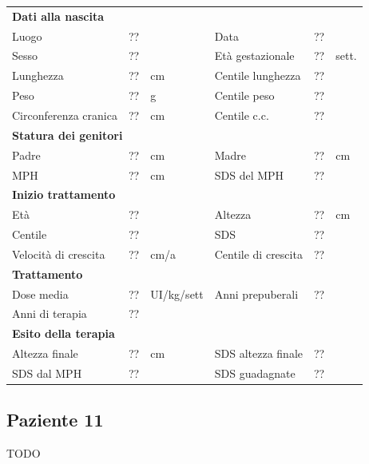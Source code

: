 \begin{table}[!h]
\begin{tabular}{lrllrl}
\toprule
\multicolumn{6}{l}{\textbf{Dati alla nascita}}\\
Luogo 		& \multicolumn{2}{l}{??} 	& Data 					& \multicolumn{2}{l}{??} 	\\
Sesso 		& \multicolumn{2}{l}{??} 	& Età gestazionale 		& ?? 		& sett.\\
Lunghezza 	& ?? 		& cm 				& Centile lunghezza		& ?? 		\\
Peso 		& ?? 		& g					& Centile peso			& ?? 		\\
Circonferenza cranica	& ?? 		& cm 	& Centile c.c.			& ?? \\
\midrule
\multicolumn{6}{l}{\textbf{Statura dei genitori}}\\
Padre 		& ?? & cm 	& Madre 				& ?? & cm \\
MPH 		& ?? & cm 	& SDS del MPH 			& ??\\
\midrule
\multicolumn{6}{l}{\textbf{Inizio trattamento}} \\
Età	& ?? & 		& Altezza 				& ?? & cm  \\
Centile & ?? 	 &		& SDS		& ?? \\
Velocità di crescita & ?? & cm/a	& Centile di crescita & ??\\
\midrule
\multicolumn{6}{l}{\textbf{Trattamento}} \\
Dose media		& ?? & UI/kg/sett & Anni prepuberali & ??\\
Anni di terapia & ??\\
\midrule
\multicolumn{6}{l}{\textbf{Esito della terapia}} \\
Altezza finale			& ?? & cm 	& SDS altezza finale		& ??\\
SDS dal MPH				& ?? &		& SDS guadagnate 			& ??\\
\bottomrule
\end{tabular}
\end{table}
\clearpage


\subsection*{Paziente 11}

TODO

